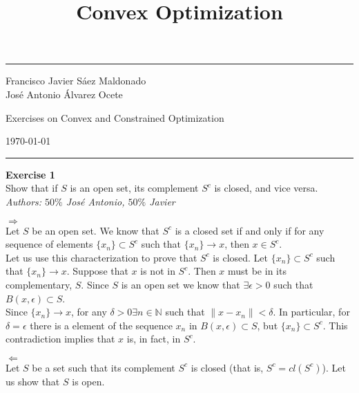 \documentclass[11pt,table]{article}
\title{Convex Optimization}
\newenvironment{problem}[2][Exercise]
{ \begin{mdframed}[backgroundcolor=gray!20] \textbf{#1 #2} \\}
	{\hspace{0.0cm}\newline\newline \emph{Authors: \(50\%\) José Antonio, \(50\%\) Javier}  \end{mdframed}}
\begin{document}

\fancyhead[C]{}
\hrule \medskip %
\begin{minipage}{0.295\textwidth}
	\raggedright
	\footnotesize
	Francisco Javier Sáez Maldonado \hfill\\
	José Antonio Álvarez Ocete \hfill\\
\end{minipage}
\begin{minipage}{0.4\textwidth}
	\centering
	\large
	Exercises on Convex and Constrained Optimization\\
\end{minipage}
\begin{minipage}{0.295\textwidth}
	\raggedleft
	\today\hfill\\
\end{minipage}
\medskip\hrule
\bigskip


\begin{problem}{1}
Show that if \( S \) is an open set, its complement \( S^c \) is closed, and vice versa.
\end{problem}

\(\boxed{\Rightarrow}\)\\
Let \(S\) be an open set. We know that \(S^c\) is a closed set if and only if for any sequence of elements \(\{x_n\} \subset S^c\) such that \(\{x_n\} \longrightarrow x\), then \(x \in S^c\). \\

Let us use this characterization to prove that \(S^c\) is closed. Let \(\{x_n\} \subset S^c\) such that \(\{x_n\} \longrightarrow x\). Suppose that \(x\) is not in \(S^c\). Then \(x\) must be in its complementary, \(S\). Since \(S\) is an open set we know that \(\exists \epsilon > 0\) such that \( B(x, \epsilon) \subset S\). \\

Since \(\{x_n\} \longrightarrow x\), for any \(\delta > 0 \exists n \in \mathbb{N}\) such that \( \parallel x - x_n \parallel < \delta\). In particular, for \(\delta = \epsilon\) there is a element of the sequence \(x_n\) in \( B(x, \epsilon) \subset S\), but \(\{x_n\} \subset S^c\). This contradiction implies that \(x\) is, in fact, in \(S^c\).

\(\boxed{\Leftarrow}\)\\
Let \(S\) be a set such that its complement $S^c$ is closed (that is, \(S^c = cl(S^c)\)). Let us show that \(S\) is open. \\
\end{document}
